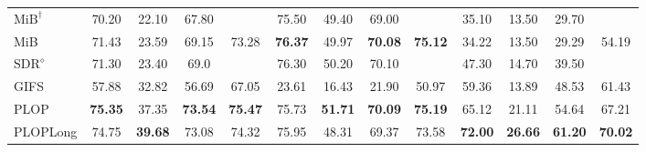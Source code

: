 \begin{table*}[t]
\begin{tabular}{@{}l|cccc||cccc||cccc@{}}
        $\text{MiB}^\dagger$ \cite{cermelli2020modelingthebackground} & 70.20                                       & 22.10                                       & 67.80                                       &                & 75.50             & 49.40          & 69.00             &                & 35.10             & 13.50             & 29.70             &                \\
        MiB \cite{cermelli2020modelingthebackground}                  & 71.43                                       & 23.59                                       & 69.15                                       & 73.28          & \textbf{76.37}    & 49.97          & \textbf{70.08}    & \textbf{75.12} & 34.22             & 13.50             & 29.29             & 54.19          \\
        $\text{SDR}^\diamond$ \cite{michieli2021sdr}                  & 71.30                                       & 23.40                                       & 69.0                                        &                & 76.30             & 50.20          & 70.10             &                & 47.30             & 14.70             & 39.50             &                \\
        GIFS \cite{cermelli2020fewshotcontinualsegm}                  & 57.88                                       & 32.82                                       & 56.69                                       & 67.05          & 23.61             & 16.43          & 21.90             & 50.97          & 59.36             & 13.89             & 48.53             & 61.43          \\
        PLOP                                                          & \textbf{75.35}                              & 37.35                                       & \textbf{73.54}                              & \textbf{75.47} & 75.73             & \textbf{51.71} & \textbf{70.09}    & \textbf{75.19} & 65.12             & 21.11             & 54.64             & 67.21          \\
        PLOPLong                                                      & 74.75                                       & \textbf{39.68}                              & 73.08                                       & 74.32          & 75.95             & 48.31          & 69.37             & 73.58          & \textbf{72.00}    & \textbf{26.66}    & \textbf{61.20}    & \textbf{70.02} \\
        \bottomrule
    \end{tabular}
\end{table*}
